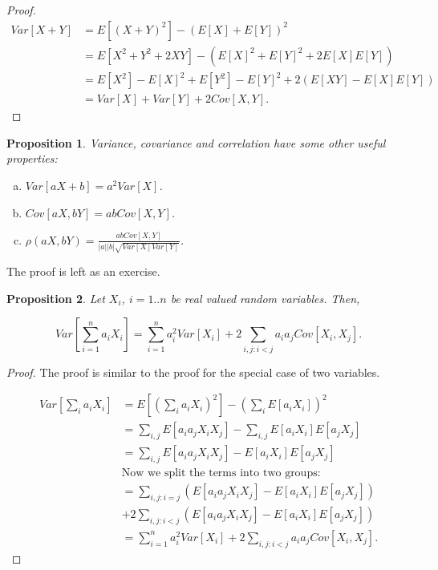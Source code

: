 \documentclass{book}
\theoremstyle{plain}%
\newtheorem{proposition}{Proposition}[section]
\theoremstyle{definition}
\begin{document}
\begin{proof}
\begin{align*}
Var[X+Y] &= E[(X +Y)^2] - (E[X]+ E[Y])^2  \\
&= E[X^2 + Y^2 + 2XY] - (E[X]^2 + E[Y]^2 + 2E[X]E[Y])\\
&= E[X^2] - E[X]^2 + E[Y^2] - E[Y]^2 + 2(E[XY] - E[X]E[Y])\\
&= Var[X] + Var[Y] + 2Cov[X,Y].
\end{align*}
\end{proof}

\begin{proposition}
Variance, covariance and correlation have some other useful properties:

\begin{enumerate}[(a)]
\item $Var[aX + b] = a^2Var[X]$.
\item $Cov[aX, bY] = abCov[X,Y]$.
\item $\rho(aX, bY) = \frac{abCov[X,Y]}{|a||b|\sqrt{Var[X]Var[Y]}}$.
\end{enumerate}\label{prop:variance2}
\end{proposition}

The proof is left as an exercise.

\begin{proposition}
Let $X_i$, $i = 1..n$ be real valued random variables. Then,

$$Var[\sum_{i=1}^n a_iX_i] = \sum_{i=1}^n a_i^2Var[X_i]+ 2\sum_{i,j:i<j}a_ia_jCov[X_i,X_j].$$
\end{proposition}

\begin{proof}
The proof is similar to the proof for the special case of two variables.

\begin{align*}
Var[\sum_{i} a_iX_i] &= E[(\sum_{i}a_iX_i)^2] - (\sum_i E[a_iX_i])^2  \\
&= \sum_{i,j} E[a_ia_jX_iX_j] - \sum_{i,j} E[a_iX_i]E[a_jX_j]\\
&= \sum_{i,j} E[a_ia_jX_iX_j] - E[a_iX_i]E[a_jX_j]\\
&\text{Now we split the terms into two groups:} \\
&= \sum_{i,j: i = j} (E[a_ia_jX_iX_j] - E[a_iX_i]E[a_jX_j]) \\ &+ 2 \sum_{i,j: i < j} (E[a_ia_jX_iX_j] - E[a_iX_i]E[a_jX_j])\\
&= \sum_{i=1}^n a_i^2Var[X_i]+ 2\sum_{i,j:i<j}a_ia_jCov[X_i,X_j].
\end{align*}
\end{proof}
\end{document}
